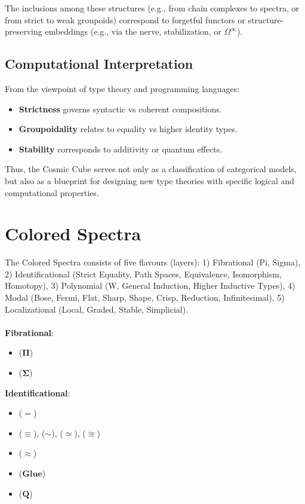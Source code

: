 \documentclass{article}
\begin{document}
The inclusions among these structures (e.g., from chain
complexes to spectra, or from strict to weak groupoids)
correspond to forgetful functors or structure-preserving
embeddings (e.g., via the nerve, stabilization, or $\Omega^\infty$).

\subsection{Computational Interpretation}

From the viewpoint of type theory and programming languages:

\begin{itemize}
\item \textbf{Strictness} governs syntactic vs coherent compositions.
\item \textbf{Groupoidality} relates to equality vs higher identity types.
\item \textbf{Stability} corresponds to additivity or quantum effects.
\end{itemize}

Thus, the Cosmic Cube serves not only as a classification of categorical models, but also as a blueprint for designing new type theories with specific logical and computational properties.

\section{Colored Spectra}

The Colored Spectra consists of five flavours (layers):
1) Fibrational (Pi, Sigma),
2) Identificational (Strict Equality, Path Spaces, Equivalence, Isomorphism, Homotopy),
3) Polynomial (W, General Induction, Higher Inductive Types),
4) Modal (Bose, Fermi, Flat, Sharp, Shape, Crisp, Reduction, Infinitesimal),
5) Localizational (Local, Graded, Stable, Simplicial).
\\
\\
\noindent \textbf{Fibrational}:
\begin{itemize}
\item {} ($\mathbf{\Pi}$)
\item {} ($\mathbf{\Sigma}$)
\end{itemize}

\noindent \textbf{Identificational}:
\begin{itemize}
\item {} ($\mathbf{=}$)
\item {} ($\mathbf{\equiv}$),
       ($\mathbf{\sim}$),
       ($\mathbf{\simeq}$),
       ($\mathbf{\cong}$)
\item {} ($\mathbf{\approx}$)
\item {} ($\mathbf{Glue}$)
\item {} ($\mathbf{Q}$)
\end{itemize}
\end{document}
